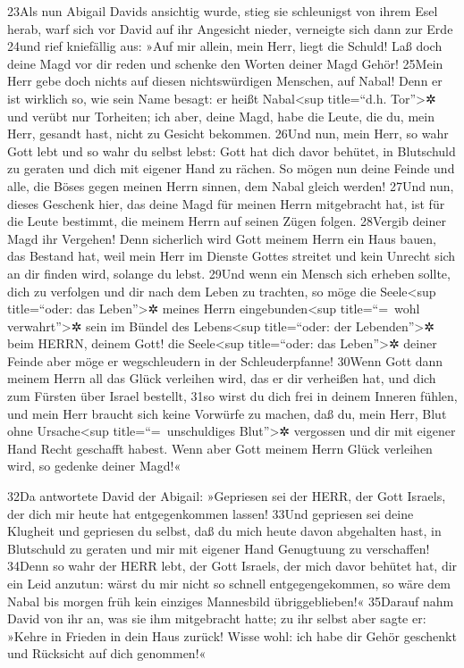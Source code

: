 23Als nun Abigail Davids ansichtig wurde, stieg sie schleunigst von
ihrem Esel herab, warf sich vor David auf ihr Angesicht nieder,
verneigte sich dann zur Erde 24und rief kniefällig aus: »Auf mir allein,
mein Herr, liegt die Schuld! Laß doch deine Magd vor dir reden und
schenke den Worten deiner Magd Gehör! 25Mein Herr gebe doch nichts auf
diesen nichtswürdigen Menschen, auf Nabal! Denn er ist wirklich so, wie
sein Name besagt: er heißt Nabal\textless sup title=``d.h.
Tor''\textgreater✲ und verübt nur Torheiten; ich aber, deine Magd, habe
die Leute, die du, mein Herr, gesandt hast, nicht zu Gesicht bekommen.
26Und nun, mein Herr, so wahr Gott lebt und so wahr du selbst lebst:
Gott hat dich davor behütet, in Blutschuld zu geraten und dich mit
eigener Hand zu rächen. So mögen nun deine Feinde und alle, die Böses
gegen meinen Herrn sinnen, dem Nabal gleich werden! 27Und nun, dieses
Geschenk hier, das deine Magd für meinen Herrn mitgebracht hat, ist für
die Leute bestimmt, die meinem Herrn auf seinen Zügen folgen. 28Vergib
deiner Magd ihr Vergehen! Denn sicherlich wird Gott meinem Herrn ein
Haus bauen, das Bestand hat, weil mein Herr im Dienste Gottes streitet
und kein Unrecht sich an dir finden wird, solange du lebst. 29Und wenn
ein Mensch sich erheben sollte, dich zu verfolgen und dir nach dem Leben
zu trachten, so möge die Seele\textless sup title=``oder: das
Leben''\textgreater✲ meines Herrn eingebunden\textless sup
title=``=~wohl verwahrt''\textgreater✲ sein im Bündel des
Lebens\textless sup title=``oder: der Lebenden''\textgreater✲ beim
HERRN, deinem Gott! die Seele\textless sup title=``oder: das
Leben''\textgreater✲ deiner Feinde aber möge er wegschleudern in der
Schleuderpfanne! 30Wenn Gott dann meinem Herrn all das Glück verleihen
wird, das er dir verheißen hat, und dich zum Fürsten über Israel
bestellt, 31so wirst du dich frei in deinem Inneren fühlen, und mein
Herr braucht sich keine Vorwürfe zu machen, daß du, mein Herr, Blut ohne
Ursache\textless sup title=``=~unschuldiges Blut''\textgreater✲
vergossen und dir mit eigener Hand Recht geschafft habest. Wenn aber
Gott meinem Herrn Glück verleihen wird, so gedenke deiner Magd!«

32Da antwortete David der Abigail: »Gepriesen sei der HERR, der Gott
Israels, der dich mir heute hat entgegenkommen lassen! 33Und gepriesen
sei deine Klugheit und gepriesen du selbst, daß du mich heute davon
abgehalten hast, in Blutschuld zu geraten und mir mit eigener Hand
Genugtuung zu verschaffen! 34Denn so wahr der HERR lebt, der Gott
Israels, der mich davor behütet hat, dir ein Leid anzutun: wärst du mir
nicht so schnell entgegengekommen, so wäre dem Nabal bis morgen früh
kein einziges Mannesbild übriggeblieben!« 35Darauf nahm David von ihr
an, was sie ihm mitgebracht hatte; zu ihr selbst aber sagte er: »Kehre
in Frieden in dein Haus zurück! Wisse wohl: ich habe dir Gehör geschenkt
und Rücksicht auf dich genommen!«

